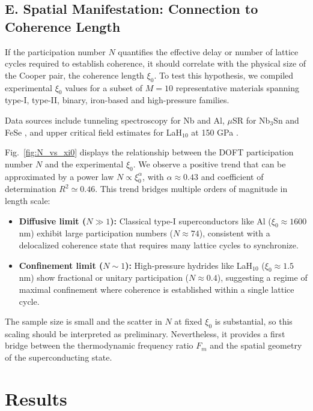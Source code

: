 \documentclass[aps,prb,twocolumn,superscriptaddress,floatfix,nofootinbib]{revtex4-2}
\newcommand{\figref}[1]{Fig.~\ref{#1}}
\begin{document}
\subsection{E. Spatial Manifestation: Connection to Coherence Length}

If the participation number $N$ quantifies the effective delay or number 
of lattice cycles required to establish coherence, it should correlate with 
the physical size of the Cooper pair, the coherence length $\xi_0$. 
To test this hypothesis, we compiled experimental $\xi_0$ values for a 
subset of $M=10$ representative materials spanning type-I, type-II, binary, 
iron-based and high-pressure families.

Data sources include tunneling spectroscopy for Nb \cite{Giaever1960} and Al, 
$\mu$SR for Nb$_3$Sn \cite{Luke1991} and FeSe \cite{Wang2016}, and upper critical 
field estimates for LaH$_{10}$ at 150 GPa \cite{Drozdov2019}.

\figref{fig:N_vs_xi0} displays the relationship between the DOFT participation number $N$ 
and the experimental $\xi_0$. We observe a positive trend that can be 
approximated by a power law $N \propto \xi_0^\alpha$, with 
$\alpha \approx 0.43$ and coefficient of determination $R^2 \simeq 0.46$. 
This trend bridges multiple orders of magnitude in length scale:
\begin{itemize}
    \item \textbf{Diffusive limit ($N \gg 1$):} Classical type-I superconductors 
    like Al ($\xi_0 \approx 1600$ nm) exhibit large participation numbers 
    ($N \approx 74$), consistent with a delocalized coherence state that 
    requires many lattice cycles to synchronize.
    \item \textbf{Confinement limit ($N \sim 1$):} High-pressure hydrides 
    like LaH$_{10}$ ($\xi_0 \approx 1.5$ nm) show fractional or unitary 
    participation ($N \approx 0.4$), suggesting a regime of maximal confinement 
    where coherence is established within a single lattice cycle.
\end{itemize}

The sample size is small and the scatter in $N$ at fixed $\xi_0$ is substantial, 
so this scaling should be interpreted as preliminary. Nevertheless, 
it provides a first bridge between the thermodynamic frequency 
ratio $F_m$ and the spatial geometry of the superconducting state.

\section{Results}
\label{sec:results}
\end{document}
